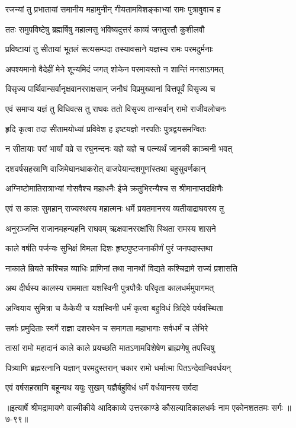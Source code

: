 
\twolineshloka
{रजन्यां तु प्रभातायां समानीय महामुनीन्}
{गीयतामविशङ्काभ्यां रामः पुत्रावुवाच ह} %

\twolineshloka
{ततः समुपविष्टेषु ब्रह्मर्षिषु महात्मसु}
{भविष्यदुत्तरं काव्यं जगतुस्तौ कुशीलवौ} %

\twolineshloka
{प्रविष्टायां तु सीतायां भूतलं सत्यसम्पदा}
{तस्यावसाने यज्ञस्य रामः परमदुर्मनाः} %

\twolineshloka
{अपश्यमानो वैदेहीं मेने शून्यमिदं जगत्}
{शोकेन परमायस्तो न शान्तिं मनसाऽगमत्} %

\twolineshloka
{विसृज्य पार्थिवान्सर्वानृक्षवानरराक्षसान्}
{जनौघं विप्रमुख्यानां वित्तपूर्वं विसृज्य च} %

\twolineshloka
{एवं समाप्य यज्ञं तु विधिवत्स तु राघवः}
{ततो विसृज्य तान्सर्वान् रामो राजीवलोचनः} %

\twolineshloka
{हृदि कृत्वा तदा सीतामयोध्यां प्रविवेश ह}
{इष्टयज्ञो नरपतिः पुत्रद्वयसमन्वितः} %

\twolineshloka
{न सीतायाः परां भार्यां वव्रे स रघुनन्दनः}
{यज्ञे यज्ञे च पत्न्यर्थं जानकी काञ्चनी भवत्} %

\twolineshloka
{दशवर्षसहस्राणि वाजिमेघानथाकरोत्}
{वाजपेयान्दशगुणांस्तथा बहुसुवर्णकान्} %

\twolineshloka
{अग्निष्टोमातिरात्राभ्यां गोसवैश्च महाधनैः}
{ईजे क्रतुभिरन्यैश्च स श्रीमानाप्तदक्षिणैः} %

\twolineshloka
{एवं स कालः सुमहान् राज्यस्थस्य महात्मनः}
{धर्मे प्रयतमानस्य व्यतीयाद्राघवस्य तु} %

\twolineshloka
{अनुरञ्जन्ति राजानमहन्यहनि राघवम्}
{ऋक्षवानररक्षांसि स्थिता रामस्य शासने} %

\twolineshloka
{काले वर्षति पर्जन्यः सुभिक्षं विमला दिशः}
{हृष्टपुष्टजनाकीर्णं पुरं जनपदास्तथा} %

\twolineshloka
{नाकाले म्रियते कश्चिन्न व्याधिः प्राणिनां तथा}
{नानर्थो विद्यते कश्चिद्रामे राज्यं प्रशासति} %

\twolineshloka
{अथ दीर्घस्य कालस्य राममाता यशस्विनी}
{पुत्रपौत्रैः परिवृता कालधर्ममुपागमत्} %

\twolineshloka
{अन्वियाय सुमित्रा च कैकेयी च यशस्विनी}
{धर्मं कृत्वा बहुविधं त्रिदिवे पर्यवस्थिता} %

\twolineshloka
{सर्वाः प्रमुदिताः स्वर्गे राज्ञा दशरथेन च}
{समागता महाभागाः सर्वधर्मं च लेभिरे} %

\twolineshloka
{तासां रामो महादानं काले काले प्रयच्छति}
{मातऽणामविशेषेण ब्राह्मणेषु तपस्विषु} %

\twolineshloka
{पित्र्याणि ब्रह्मरत्नानि यज्ञान् परमदुस्तरान्}
{चकार रामो धर्मात्मा पितऽन्देवान्विवर्धयन्} %

\twolineshloka
{एवं वर्षसहस्राणि बहून्यथ ययुः सुखम्}
{यज्ञैर्बहुविधं धर्मं वर्धयानस्य सर्वदा} %


॥इत्यार्षे श्रीमद्रामायणे वाल्मीकीये आदिकाव्ये उत्तरकाण्डे कौसल्यादिकालधर्मः नाम एकोनशततमः सर्गः ॥७-९९॥
